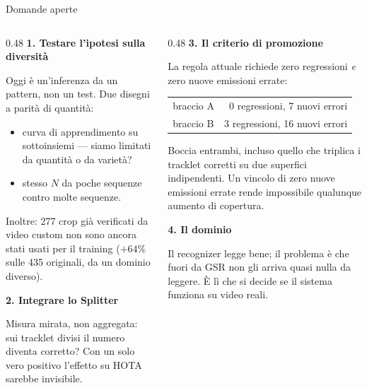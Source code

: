 \documentclass[aspectratio=169,10pt]{beamer}
\begin{document}
\begin{frame}{Domande aperte}
  \begin{columns}[T]
    \begin{column}{0.48\textwidth}
      \small
      \textbf{1. Testare l'ipotesi sulla diversità}
      \vspace{0.2em}

      Oggi è un'inferenza da un pattern, non un test. Due disegni a parità di
      quantità:
      \begin{itemize}\footnotesize
        \item curva di apprendimento su sottoinsiemi --- siamo limitati da
              quantità o da varietà?
        \item stesso $N$ da poche sequenze contro molte sequenze.
      \end{itemize}
      \vspace{0.2em}
      Inoltre: 277 crop già verificati da video custom non sono ancora stati
      usati per il training ($+64\%$ sulle 435 originali, da un dominio
      diverso).
      \vspace{0.5em}

      \textbf{2. Integrare lo Splitter}
      \vspace{0.2em}

      Misura mirata, non aggregata: sui tracklet divisi il numero diventa
      corretto? Con un solo vero positivo l'effetto su HOTA sarebbe
      invisibile.
    \end{column}
    \begin{column}{0.48\textwidth}
      \small
      \textbf{3. Il criterio di promozione}
      \vspace{0.2em}

      La regola attuale richiede zero regressioni \emph{e} zero nuove
      emissioni errate:
      \begin{center}\footnotesize
      \begin{tabular}{lr}
        \toprule
        braccio A & 0 regressioni, 7 nuovi errori \\
        braccio B & 3 regressioni, 16 nuovi errori \\
        \bottomrule
      \end{tabular}
      \end{center}
      \vspace{0.2em}
      \footnotesize
      Boccia entrambi, incluso quello che triplica i tracklet corretti su due
      superfici indipendenti. Un vincolo di zero nuove emissioni errate rende
      impossibile qualunque aumento di copertura.
      \vspace{0.5em}

      \small
      \textbf{4. Il dominio}
      \vspace{0.2em}

      Il recognizer legge bene; il problema è che fuori da GSR non gli arriva
      quasi nulla da leggere. È lì che si decide se il sistema funziona su
      video reali.
    \end{column}
  \end{columns}
\end{frame}
\end{document}
